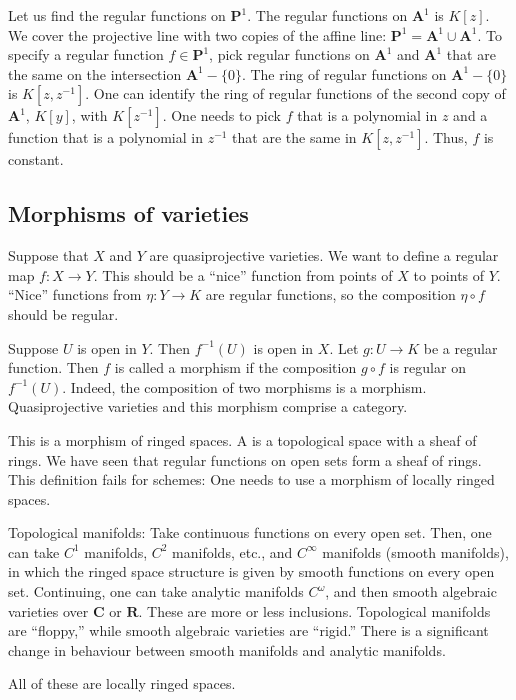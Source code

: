 \documentclass [11 pt, oneside] {article}
\begin{document}
\begin{example}[ ]\label{}
Let us find the regular functions on $\mathbf{P}^1$. The regular functions on $\mathbf{A}^1$ is $K[z]$. We cover the projective line with two copies of the affine line: $\mathbf{P}^1 = \mathbf{A}^1\cup \mathbf{A}^1$. To specify a regular function $f\in \mathbf{P}^1$, pick regular functions on $\mathbf{A}^1$ and $\mathbf{A}^1$ that are the same on the intersection $\mathbf{A}^1-\{0\}$. The ring of regular functions on $\mathbf{A}^1-\{0\}$ is $K[z,z^{-1}]$. One can identify the ring of regular functions of the second copy of $\mathbf{A}^1$, $K[y]$, with $K[z^{-1}]$. One needs to pick $f$ that is a polynomial in $z$ and a function that is a polynomial in $z^{-1}$ that are the same in $K[z,z^{-1}]$. Thus, $f$ is constant.
\end{example}

\subsection{Morphisms of varieties}
Suppose that $X$ and $Y$ are quasiprojective varieties. We want to define a regular map $f:X\longrightarrow Y$. This should be a ``nice'' function from points of $X$ to points of $Y$. ``Nice'' functions from $\eta:Y\longrightarrow K$ are regular functions, so the composition $\eta\circ f$ should be regular.

Suppose $U$ is open in $Y$. Then $f^{-1}(U)$ is open in $X$. Let $g: U\longrightarrow K$ be a regular function. Then $f$ is called a morphism if the composition $g\circ f$ is regular on $f^{-1}(U)$. Indeed, the composition of two morphisms is a morphism. Quasiprojective varieties and this morphism comprise a category.

\begin{warn}
	This is a morphism of ringed spaces. A  is a topological space with a sheaf of rings. We have seen that regular functions on open sets form a sheaf of rings. This definition fails for schemes: One needs to use a morphism of locally ringed spaces.
\end{warn}

\begin{example}\label{}
	 Topological manifolds: Take continuous functions on every open set. Then, one can take $C^1$ manifolds, $C^2$ manifolds, etc., and $C^\infty$ manifolds (smooth manifolds), in which the ringed space structure is given by smooth functions on every open set. Continuing, one can take analytic manifolds $C^\omega$, and then smooth algebraic varieties over $\mathbf{C}$ or $\mathbf{R}$. These are more or less inclusions. Topological manifolds are ``floppy,'' while smooth algebraic varieties are ``rigid.'' There is a significant change in behaviour between smooth manifolds and analytic manifolds.  

	 All of these are locally ringed spaces.
\end{example}
\end{document}
